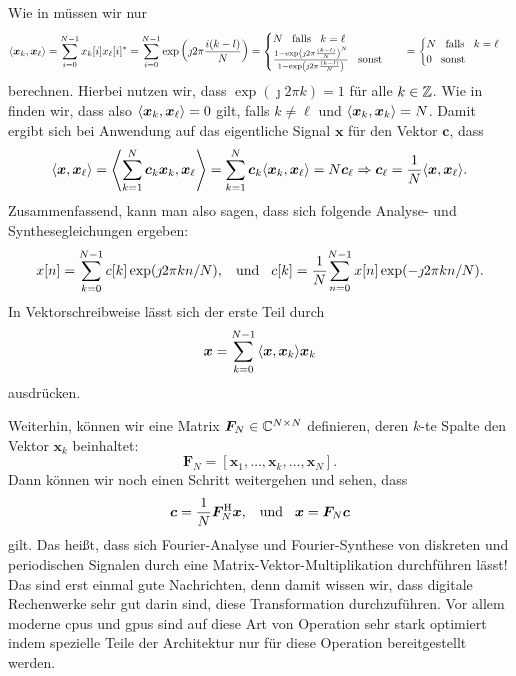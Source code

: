 Wie in  müssen wir nur 
\[
{\left\langle \bm x_k,\bm x_\ell \right\rangle} 
    = {\sum\limits_{i=0}^{N-1}{
        x_k[i] x_\ell[i]^\ast
    }}
    = {\sum\limits_{i=0}^{N-1}{
        \exp\left(\jmath 2 \pi \frac{i(k-l)}{N} \right)
    }}
    = \begin{cases}
        N {\hspace{3mm} \text{falls} \hspace{3mm}} k = \ell \\
        \frac{
            1 - \exp\left(\jmath 2 \pi \frac{(k-l)}{N} \right)^N   
        }{
            1 - \exp\left(\jmath 2 \pi \frac{(k-l)}{N} \right)
        } {\hspace{3mm} \text{sonst} \hspace{3mm}}
    \end{cases}
    = \begin{cases}
        N {\hspace{3mm} \text{falls} \hspace{3mm}} k = \ell \\
        0 {\hspace{3mm} \text{sonst} \hspace{3mm}}
    \end{cases}
\]
berechnen.
Hierbei nutzen wir, dass $\exp(\jmath 2 \pi k) = 1$ für alle $k \in \mathbb{Z}$.
Wie in  finden wir, dass also ${\left\langle \bm x_k,\bm x_\ell \right\rangle} = 0$ gilt, falls $k \neq \ell$ und ${\left\langle \bm x_k,\bm x_k \right\rangle} = N$.
Damit ergibt sich bei Anwendung auf das eigentliche Signal $\bm x$ für den Vektor $\bm c$, dass
\[
{\left\langle \bm x,\bm x_\ell \right\rangle}
    = {\left\langle {\sum\limits_{k=1}^{N}{\bm c_k \bm x_k}},\bm x_\ell \right\rangle}
    = {\sum\limits_{k=1}^{N}{\bm c_k {\left\langle \bm x_k,\bm x_\ell \right\rangle}}}
    = N \bm c_\ell
\Rightarrow
\bm c_\ell = \frac{1}{N}{\left\langle \bm x,\bm x_\ell \right\rangle}.
\]
Zusammenfassend, kann man also sagen, dass sich folgende Analyse- und Synthesegleichungen ergeben:
\begin{equation}\label{eq:fourier:disc_analys_synth}
    x[n] = {\sum\limits_{k = 0}^{N-1}{c[k]\exp(\jmath 2 \pi k n/N)}}, {\hspace{3mm} \text{und} \hspace{3mm}}
    c[k] = \frac{1}{N}{\sum\limits_{n = 0}^{N-1}{x[n]\exp(-\jmath 2 \pi k n/N)}}.
\end{equation}
In Vektorschreibweise lässt sich der erste Teil durch
\begin{equation}\label{eq:fourier:disc_analys_synth_vec}
    \bm x = {\sum\limits_{k = 0}^{N-1}{{\left\langle \bm x,\bm x_k \right\rangle} \bm x_k}}
\end{equation}
ausdrücken.

Weiterhin, können wir eine Matrix $\bm F_N \in \mathbb{C}^{N \times N}$ definieren, deren $k$-te Spalte den Vektor $\bm x_k$ beinhaltet:
\[
\bm F_N = \left[
    \bm x_1, \ldots, \bm x_k, \ldots, \bm x_N 
\right].
\]
Dann können wir noch einen Schritt weitergehen und sehen, dass
\[
\bm c = \frac{1}{N} \bm F_N^{\mathrm{H}} \bm x, {\hspace{3mm} \text{und} \hspace{3mm}} \bm x = \bm F_N \bm c
\]
gilt.
Das heißt, dass sich Fourier-Analyse und Fourier-Synthese von diskreten und periodischen Signalen durch eine Matrix-Vektor-Multiplikation durchführen lässt!
Das sind erst einmal gute Nachrichten, denn damit wissen wir, dass digitale Rechenwerke sehr gut darin sind, diese Transformation durchzuführen.
Vor allem moderne \glspl{cpu} und \glspl{gpu} sind auf diese Art von Operation sehr stark optimiert indem spezielle Teile der Architektur nur für diese Operation bereitgestellt werden.

